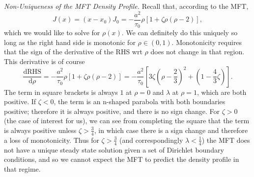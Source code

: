 \documentclass[
reprint,
 amsmath,amssymb,
 aps,
 prl,
]{revtex4-1}
\begin{document}
\textit{Non-Uniqueness of the MFT Density Profile.}
Recall that, according to the MFT,
\begin{equation}
 J(x) = (x-x_0)J_0 = -\frac{a^2}{\tau_0} \rho \left[1+\zeta \rho\left(\rho-2\right)\right], \label{cubic}
\end{equation}
which we would like to solve for $\rho(x)$. We can definitely do this uniquely so long as the right hand side is monotonic for $\rho \in (0, 1)$. Monotonicity requires that the sign of the derivative of the RHS wrt $\rho$ does not change in that region.
This derivative is of course
\begin{equation}
 \frac{\mathrm{d} \mathrm{RHS}}{\mathrm{d} \rho} = -\frac{a^2}{\tau_0} \rho \left[1+\zeta \rho\left(\rho-2\right)\right] = -\frac{a^2}{\tau_0} \left[ 3 \zeta (\rho-\frac{2}{3})^2 + (1-\frac{4}{3} \zeta) \right].
\end{equation}
The term in square brackets is always $1$ at $\rho=0$ and $\lambda$ at $\rho=1$, which are both positive.
If $\zeta<0$, the term is an n-shaped parabola with both boundaries positive; therefore it is always positive, and there is no sign change.
For $\zeta>0$ (the case of interest for us), we can see from completing the square that the term is always positive unless $\zeta > \frac{3}{4}$, in which case there is a sign change and therefore a loss of monotonicity.
Thus for $\zeta > \frac{3}{4}$ (and correspondingly $\lambda<\frac{1}{4}$) the MFT does not have a unique steady state solution given a set of Dirichlet boundary conditions, and so we cannot expect the MFT to predict the density profile
in that regime.
\end{document}
